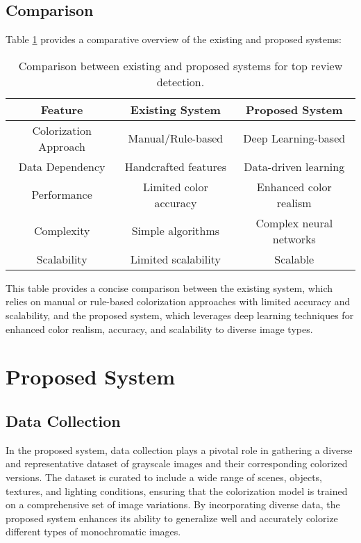 \subsection{Comparison}
Table \ref{table:comparison} provides a comparative overview of the existing and proposed systems:

\begin{table}[H]
    \centering
    \begin{tabular}{|c|c|c|}
        \hline
        \textbf{Feature} & \textbf{Existing System} & \textbf{Proposed System} \\
        \hline
        Colorization Approach & Manual/Rule-based & Deep Learning-based \\
        \hline
        Data Dependency & Handcrafted features & Data-driven learning \\
        \hline
        Performance & Limited color accuracy & Enhanced color realism \\
        \hline
        Complexity & Simple algorithms & Complex neural networks \\
        \hline
        Scalability & Limited scalability & Scalable  \\
        \hline
    \end{tabular}
    \caption{Comparison between existing and proposed systems for top review detection.}
    \label{table:comparison}
\end{table}

This table provides a concise comparison between the existing system, which relies on manual or rule-based colorization approaches with limited accuracy and scalability, and the proposed system, which leverages deep learning techniques for enhanced color realism, accuracy, and scalability to diverse image types.

\section{Proposed System}

\subsection{Data Collection}

In the proposed system, data collection plays a pivotal role in gathering a diverse and representative dataset of grayscale images and their corresponding colorized versions. The dataset is curated to include a wide range of scenes, objects, textures, and lighting conditions, ensuring that the colorization model is trained on a comprehensive set of image variations. By incorporating diverse data, the proposed system enhances its ability to generalize well and accurately colorize different types of monochromatic images.


